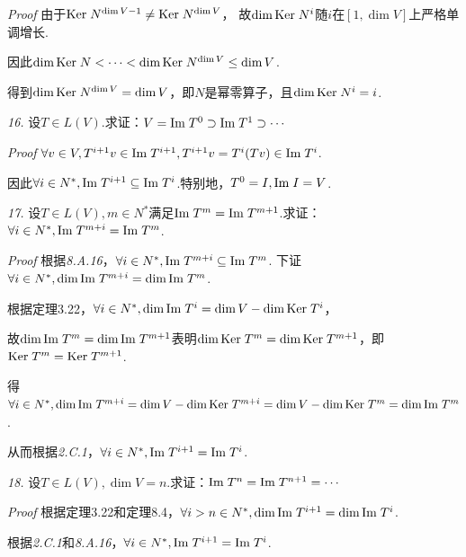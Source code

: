 \textit{Proof}
由于\(\mathrm{Ker \;} N^{\dim V-1} \ne \mathrm{Ker \;} N^{\dim V}\)，
故\(\dim \mathrm{Ker \;} N^i\)随\(i\)在\([1,\dim V]\)上严格单调增长.

因此\(\dim \mathrm{Ker \;} N<\cdots<\dim \mathrm{Ker \;} N^{\dim V} \leq \dim V\).

得到\(\dim \mathrm{Ker \;} N^{\dim V}=\dim V\)，即\(N\)是幂零算子，且\(\dim \mathrm{Ker \;} N^i=i\).

\hspace*{\fill}

\textit{16.}
设\(T \in L(V)\).求证：\(V=\mathrm{Im \;} T^0 \supset \mathrm{Im \;} T^1 \supset \cdots\)

\textit{Proof}
\(\forall v \in V,T^{i+1}v \in \mathrm{Im \;} T^{i+1},T^{i+1}v=T^i(Tv) \in \mathrm{Im \;} T^i\).

因此\(\forall i \in N^*,\mathrm{Im \;} T^{i+1} \subseteq \mathrm{Im \;} T^i\).特别地，\(T^0=I,\mathrm{Im \;} I=V\).

\hspace*{\fill}

\textit{17.}
设\(T \in L(V),m \in N^*\)满足\(\mathrm{Im \;} T^m=\mathrm{Im \;} T^{m+1}\).求证：\(\forall i \in N^*,\mathrm{Im \;} T^{m+i}=\mathrm{Im \;} T^m\).

\textit{Proof}
根据\textit{8.A.16}，\(\forall i \in N^*,\mathrm{Im \;} T^{m+i} \subseteq \mathrm{Im \;} T^m\).
下证\(\forall i \in N^*,\dim \mathrm{Im \;} T^{m+i}=\dim \mathrm{Im \;} T^m\).

根据定理3.22，\(\forall i \in N^*,\dim \mathrm{Im \;} T^i=\dim V-\dim \mathrm{Ker \;} T^i\)，

故\(\dim \mathrm{Im \;} T^m=\dim \mathrm{Im \;} T^{m+1}\)表明\(\dim \mathrm{Ker \;} T^m=\dim \mathrm{Ker \;} T^{m+1}\)，即\(\mathrm{Ker \;} T^m =\mathrm{Ker \;} T^{m+1}\).

得\(\forall i \in N^*,\dim \mathrm{Im \;} T^{m+i}=\dim V-\dim \mathrm{Ker \;} T^{m+i}=\dim V-\dim \mathrm{Ker \;} T^m=\dim \mathrm{Im \;} T^m\).

从而根据\textit{2.C.1}，\(\forall i \in N^*,\mathrm{Im \;} T^{i+1}=\mathrm{Im \;} T^i\).

\hspace*{\fill}

\textit{18.}
设\(T \in L(V),\dim V=n\).求证：\(\mathrm{Im \;} T^n=\mathrm{Im \;} T^{n+1}=\cdots\)

\textit{Proof}
根据定理3.22和定理8.4，\(\forall i>n \in N^*,\dim \mathrm{Im \;} T^{i+1}=\dim \mathrm{Im \;} T^i\).

根据\textit{2.C.1}和\textit{8.A.16}，\(\forall i \in N^*,\mathrm{Im \;} T^{i+1}=\mathrm{Im \;} T^i\).

